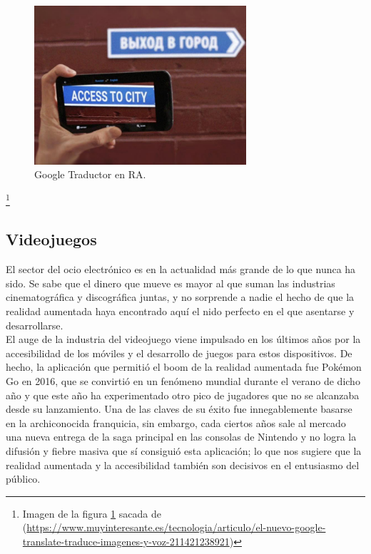 {\begin{figure}[H]
     \centering
     \includegraphics[width=0.7\textwidth]{Images/google-translate.jpg}
     \caption{Google Traductor en RA.}
     \label{fig:googletranslate}
 \end{figure}
 {\let\thefootnote\relax\footnote{{Imagen de la figura \ref{fig:googletranslate} sacada de (\url{https://www.muyinteresante.es/tecnologia/articulo/el-nuevo-google-translate-traduce-imagenes-y-voz-211421238921})}}


\subsection{Videojuegos}
El sector del ocio electrónico es en la actualidad más grande de lo que nunca ha sido. Se sabe que el dinero que mueve es mayor al que suman las industrias cinematográfica y discográfica juntas, y no sorprende a nadie el hecho de que la realidad aumentada haya encontrado aquí el nido perfecto en el que asentarse y desarrollarse.\\

El auge de la industria del videojuego viene impulsado en los últimos años por la accesibilidad de los móviles y el desarrollo de juegos para estos dispositivos. De hecho, la aplicación que permitió el boom de la realidad aumentada fue Pokémon Go en 2016, que se convirtió en un fenómeno mundial durante el verano de dicho año y que este año ha experimentado otro pico de jugadores que no se alcanzaba desde su lanzamiento. Una de las claves de su éxito fue innegablemente basarse en la archiconocida franquicia, sin embargo, cada ciertos años sale al mercado una nueva entrega de la saga principal en las consolas de Nintendo y no logra la difusión y fiebre masiva que sí consiguió esta aplicación; lo que nos sugiere que la realidad aumentada y la accesibilidad también son decisivos en el entusiasmo del público.\\

}}

